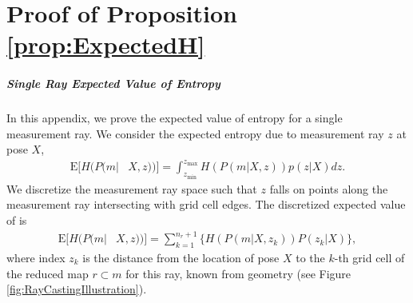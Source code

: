 \doublespacing
\chapter{Proof of Proposition \ref{prop:ExpectedH}}

\paragraph{Single Ray Expected Value of Entropy}

In this appendix, we prove the expected value of entropy for a single measurement ray. We consider the expected entropy due to measurement ray $z$ at pose $X$,
\begin{align}
\label{eqn:HRayInt}
\text{E}[H(P(m|&X,z))]
=\int_{z_\text{min}}^{z_\text{max}}
H(P(m|X,z))p(z|X)
dz.
\end{align}
We discretize the measurement ray space such that $z$ falls on points along the measurement ray intersecting with grid cell edges.
The discretized expected value of  is
\begin{align}
\label{eqn:DiscExpEntropyRayAppendix}
\text{E}[H(P(m|&X,z))]=\sum_{k=1}^{n_{r}+1}\bigg\{H(P(m|X,z_{k}))P(z_{k}|X)\bigg\},
\end{align}
where index $z_{k}$ is the distance from the location of pose $X$ to the $k$-th grid cell of the reduced map $r\subset m$ for this ray, known from geometry (see Figure \ref{fig:RayCastingIllustration}).

